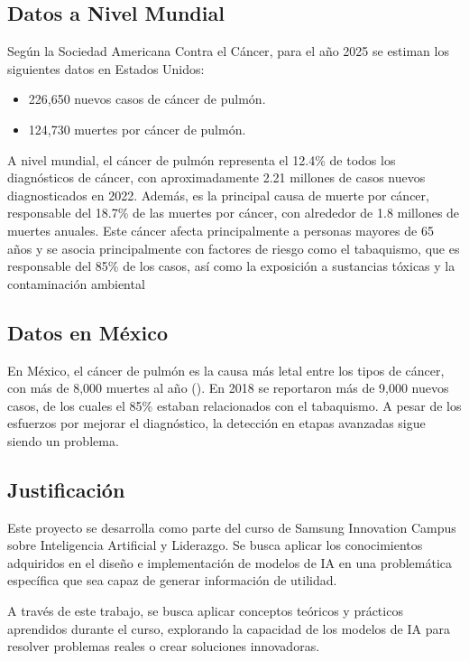 \subsection{Datos a Nivel Mundial}
Según la Sociedad Americana Contra el Cáncer\parencite{cancer_american}, para el año 2025 se estiman los siguientes datos en Estados Unidos:
\begin{itemize}
    \item 226,650 nuevos casos de cáncer de pulmón.
    \item 124,730 muertes por cáncer de pulmón.
\end{itemize}
A nivel mundial, el cáncer de pulmón representa el 12.4\% de todos los diagnósticos de cáncer, con aproximadamente 2.21 millones de casos nuevos diagnosticados en 2022. Además, es la principal causa de muerte por cáncer, responsable del 18.7\% de las muertes por cáncer, con alrededor de 1.8 millones de muertes anuales. Este cáncer afecta principalmente a personas mayores de 65 años y se asocia principalmente con factores de riesgo como el tabaquismo, que es responsable del 85\% de los casos, así como la exposición a sustancias tóxicas y la contaminación ambiental \parencite{anticancerlifestyle,cancerorg,who}
\subsection{Datos en México}
En México, el cáncer de pulmón es la causa más letal entre los tipos de cáncer, con más de 8,000 muertes al año (\cite{INCan2025}). En 2018 se reportaron más de 9,000 nuevos casos, de los cuales el 85\% estaban relacionados con el tabaquismo. A pesar de los esfuerzos por mejorar el diagnóstico, la detección en etapas avanzadas sigue siendo un problema.

\subsection{Justificación}
Este proyecto se desarrolla como parte del curso de Samsung Innovation Campus sobre Inteligencia Artificial y Liderazgo. Se busca aplicar los conocimientos adquiridos en el diseño e implementación de modelos de IA en una problemática específica que sea capaz de generar información de utilidad.

A través de este trabajo, se busca aplicar conceptos teóricos y prácticos aprendidos durante el curso, explorando la capacidad de los modelos de IA para resolver problemas reales o crear soluciones innovadoras.

